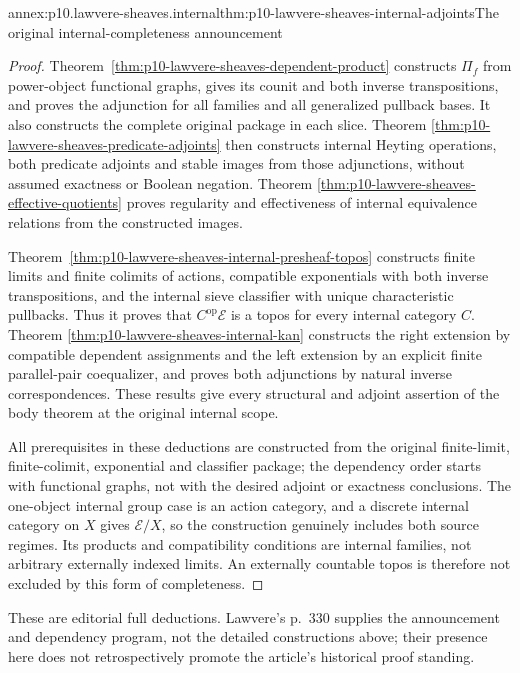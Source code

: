 
\begin{annexitem}{annex:p10.lawvere-sheaves.internal}{thm:p10-lawvere-sheaves-internal-adjoints}{The original internal-completeness announcement}
\begin{proof}
Theorem~\ref{thm:p10-lawvere-sheaves-dependent-product} constructs
\(\Pi_f\) from power-object functional graphs, gives its counit
and both inverse transpositions, and proves the adjunction for all
families and all generalized pullback bases.  It also constructs
the complete original package in each slice.  Theorem
\ref{thm:p10-lawvere-sheaves-predicate-adjoints} then constructs
internal Heyting operations, both predicate adjoints and stable
images from those adjunctions, without assumed exactness or
Boolean negation.  Theorem
\ref{thm:p10-lawvere-sheaves-effective-quotients} proves regularity
and effectiveness of internal equivalence relations from the
constructed images.

Theorem~\ref{thm:p10-lawvere-sheaves-internal-presheaf-topos}
constructs finite limits and finite colimits of actions, compatible
exponentials with both inverse transpositions, and the internal
sieve classifier with unique characteristic pullbacks.  Thus it
proves that \(C^{\mathrm{op}}\mathcal E\) is a topos for
every internal category \(C\).  Theorem
\ref{thm:p10-lawvere-sheaves-internal-kan} constructs the right
extension by compatible dependent assignments and the left
extension by an explicit finite parallel-pair coequalizer, and
proves both adjunctions by natural inverse correspondences.
These results give every structural and adjoint assertion of the
body theorem at the original internal scope.

All prerequisites in these deductions are constructed from the
original finite-limit, finite-colimit, exponential and classifier
package; the dependency order starts with functional graphs,
not with the desired adjoint or exactness conclusions.  The
one-object internal group case is an action category, and a
discrete internal category on \(X\) gives \(\mathcal E/X\),
so the construction genuinely includes both source regimes.
Its products and compatibility conditions are internal families,
not arbitrary externally indexed limits.  An externally countable
topos is therefore not excluded by this form of completeness.
\end{proof}

These are editorial full deductions.  Lawvere's p.~330 supplies the
announcement and dependency program, not the detailed constructions
above; their presence here does not retrospectively promote the
article's historical proof standing.
\end{annexitem}

